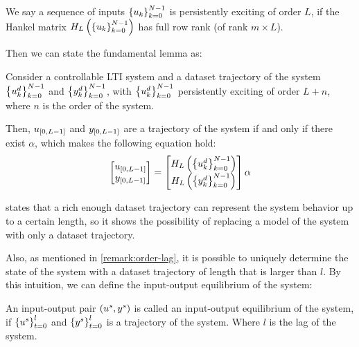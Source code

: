 \begin{definition}\label{def:persistently-exciting}
    We say a sequence of inputs $\left\{u_k\right\}_{k=0}^{N-1}$ is persistently exciting of order $L$, if the Hankel matrix $H_{L}\left( \left\{u_k\right\}_{k=0}^{N-1} \right)$ has full row rank (of rank $m \times L$).
\end{definition}

Then we can state the fundamental lemma as:

\begin{lemma}\label{lemma:fundamental-lemma}
    Consider a controllable LTI system and a dataset trajectory of the system $\left\{u^d_k\right\}_{k=0}^{N-1}$ and $\left\{y^d_k\right\}_{k=0}^{N-1}$, with $\left\{u^d_k\right\}_{k=0}^{N-1}$ persistently exciting of order $L + n$, where $n$ is the order of the system.

    Then, $u_{\left[ 0, L-1 \right]}$ and $y_{\left[ 0, L-1 \right]}$ are a trajectory of the system if and only if there exist $\alpha$, which makes the following equation hold:
    \begin{equation*}
        \begin{bmatrix}
            u_{\left[ 0, L-1 \right]} \\
            y_{\left[ 0, L-1 \right]} \\
        \end{bmatrix} = \begin{bmatrix}
            H_{L}\left( \left\{u^d_k\right\}_{k=0}^{N-1} \right) \\
            H_{L}\left( \left\{y^d_k\right\}_{k=0}^{N-1} \right) \\
        \end{bmatrix} \alpha
    \end{equation*}
\end{lemma}

 states that a rich enough dataset trajectory can represent the system behavior up to a certain length, so it shows the possibility of replacing a model of the system with only a dataset trajectory.

Also, as mentioned in \cref{remark:order-lag}, it is possible to uniquely determine the state of the system with a dataset trajectory of length that is larger than $l$.
By this intuition, we can define the input-output equilibrium of the system:

\begin{definition}\label{def:input-output-equilibrium}
    An input-output pair $\left({u^s}, {y^s}\right)$ is called an input-output equilibrium of the system, if $\left\{{u^s}\right\}_{t=0}^{l}$ and $\left\{{y^s}\right\}_{t=0}^{l}$ is a trajectory of the system.
    Where $l$ is the lag of the system.
\end{definition}

